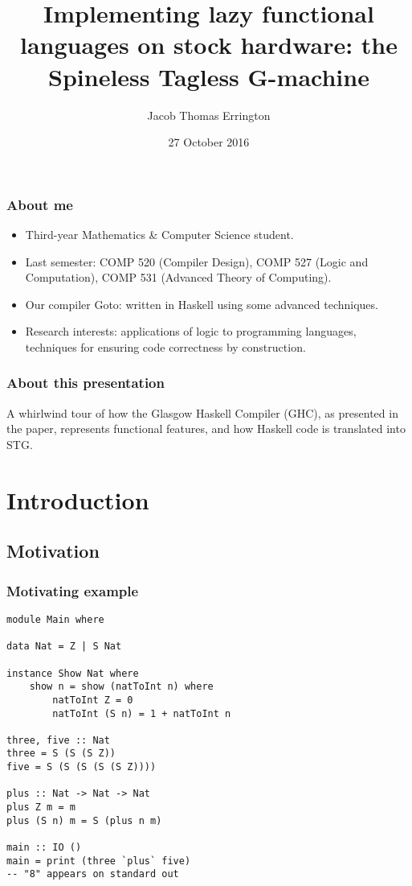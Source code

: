\documentclass{beamer}
\author{Jacob Thomas Errington}
\title{
    Implementing lazy functional languages on stock hardware:
    the Spineless Tagless G-machine
}
\institute{McGill University}
\date{27 October 2016}
\begin{document}
\frame{\titlepage}

\begin{frame}
    \frametitle{About me}

    \begin{itemize}
        \item Third-year Mathematics \& Computer Science student.
        \item Last semester:
            COMP 520 (Compiler Design),
            COMP 527 (Logic and Computation),
            COMP 531 (Advanced Theory of Computing).
        \item Our compiler Goto: written in Haskell using some advanced
            techniques.
        \item Research interests: applications of logic to programming
            languages, techniques for ensuring code correctness by
            construction.
    \end{itemize}
\end{frame}

\begin{frame}
    \frametitle{About this presentation}

    A whirlwind tour of how the Glasgow Haskell Compiler (GHC), as presented in
    the paper, represents functional features, and how Haskell code is
    translated into STG.

    \tableofcontents
\end{frame}

\section{Introduction}

\subsection{Motivation}

\begin{frame}
    \frametitle{Motivating example}

    \begin{lstlisting}
module Main where

data Nat = Z | S Nat

instance Show Nat where
    show n = show (natToInt n) where
        natToInt Z = 0
        natToInt (S n) = 1 + natToInt n

three, five :: Nat
three = S (S (S Z))
five = S (S (S (S (S Z))))

plus :: Nat -> Nat -> Nat
plus Z m = m
plus (S n) m = S (plus n m)

main :: IO ()
main = print (three `plus` five)
-- "8" appears on standard out
    \end{lstlisting}
\end{frame}
\end{document}
